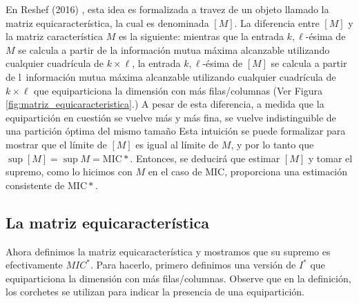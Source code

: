         En Reshef (2016) \cite{Reshef2016}, esta idea es formalizada a travez de un objeto llamado la matriz equicaracter\'istica, la cual es denominada $[M]$. La diferencia entre $[M]$ y la matriz caracter\'istica $M$ es la siguiente: mientras que la entrada $k, \ell$-\'esima de $M$ se calcula a partir de la informaci\'on mutua m\'axima alcanzable utilizando cualquier cuadr\'icula de $k\times\ell$, la entrada $k, \ell$-\'esima de $[M]$ se calcula a partir de l\ informaci\'on mutua m\'axima alcanzable utilizando cualquier cuadr\'icula de $k\times\ell$ que equiparticiona la dimensi\'on con m\'as filas/columnas (Ver Figura \ref{fig:matriz_equicaracteristica}.) A pesar de esta diferencia, a medida que la equipartici\'on en cuesti\'on se vuelve m\'as y m\'as fina, se vuelve indistinguible de una partici\'on \'optima del mismo tama\~no Esta intuici\'on se puede formalizar para mostrar que el l\'imite de $[M]$ es igual al l\'imite de $M$, y por lo tanto que $\sup [M]=\sup M=\mathrm{MIC}*$. Entonces, se deducir\'a que estimar $[M]$ y tomar el supremo, como lo hicimos con $M$ en el caso de MIC, proporciona una estimaci\'on consistente de $\mathrm{MIC}*$.
    
        \subsection{La matriz equicaracter\'istica} 
    
        Ahora definimos la matriz equicaracter\'istica y mostramos que su supremo es efectivamente $MIC^*$. Para hacerlo, primero definimos una versi\'on de $I^*$ que equiparticiona la dimensi\'on con m\'as filas/columnas. Observe que en la definici\'on, los corchetes se utilizan para indicar la presencia de una equipartici\'on.
    
